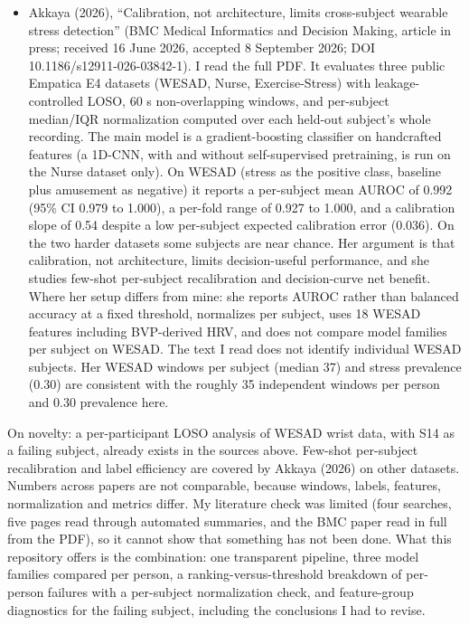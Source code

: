 \documentclass[11pt]{article}
\begin{document}
\begin{itemize}
  CalmSense (public repository urmeo/CalmSense) reports a LOSO benchmark
  on WESAD (random forest accuracy 0.913 overall, wrist about 0.89 to
  0.91). It stresses that subject leakage, motion, dataset shift and
  calibration inflate typical numbers. It does not break results down
  per subject. \href{https://github.com/urmeo/CalmSense}{Repository}
\item
  Akkaya (2026), ``Calibration, not architecture, limits cross-subject
  wearable stress detection'' (BMC Medical Informatics and Decision
  Making, article in press; received 16 June 2026, accepted 8 September
  2026; DOI 10.1186/s12911-026-03842-1). I read the full PDF. It
  evaluates three public Empatica E4 datasets (WESAD, Nurse,
  Exercise-Stress) with leakage-controlled LOSO, 60 s non-overlapping
  windows, and per-subject median/IQR normalization computed over each
  held-out subject's whole recording. The main model is a
  gradient-boosting classifier on handcrafted features (a 1D-CNN, with
  and without self-supervised pretraining, is run on the Nurse dataset
  only). On WESAD (stress as the positive class, baseline plus amusement
  as negative) it reports a per-subject mean AUROC of 0.992 (95\% CI
  0.979 to 1.000), a per-fold range of 0.927 to 1.000, and a calibration
  slope of 0.54 despite a low per-subject expected calibration error
  (0.036). On the two harder datasets some subjects are near chance. Her
  argument is that calibration, not architecture, limits decision-useful
  performance, and she studies few-shot per-subject recalibration and
  decision-curve net benefit. Where her setup differs from mine: she
  reports AUROC rather than balanced accuracy at a fixed threshold,
  normalizes per subject, uses 18 WESAD features including BVP-derived
  HRV, and does not compare model families per subject on WESAD. The
  text I read does not identify individual WESAD subjects. Her WESAD
  windows per subject (median 37) and stress prevalence (0.30) are
  consistent with the roughly 35 independent windows per person and 0.30
  prevalence here.
\end{itemize}

On novelty: a per-participant LOSO analysis of WESAD wrist data, with
S14 as a failing subject, already exists in the sources above. Few-shot
per-subject recalibration and label efficiency are covered by Akkaya
(2026) on other datasets. Numbers across papers are not comparable,
because windows, labels, features, normalization and metrics differ. My
literature check was limited (four searches, five pages read through
automated summaries, and the BMC paper read in full from the PDF), so it
cannot show that something has not been done. What this repository
offers is the combination: one transparent pipeline, three model
families compared per person, a ranking-versus-threshold breakdown of
per-person failures with a per-subject normalization check, and
feature-group diagnostics for the failing subject, including the
conclusions I had to revise.
\end{document}
